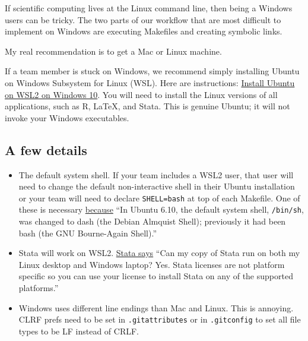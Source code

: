 If scientific computing lives at the Linux command line,
then being a Windows users can be tricky.
The two parts of our workflow that are most difficult to implement on Windows
are executing Makefiles and creating symbolic links.

My real recommendation is to get a Mac or Linux machine.

If a team member is stuck on Windows,
we recommend simply installing Ubuntu on Windows Subsystem for Linux (WSL).
Here are instructions:
\href{https://ubuntu.com/tutorials/install-ubuntu-on-wsl2-on-windows-10}{Install Ubuntu on WSL2 on Windows 10}.
You will need to install the Linux versions of all applications, such as R, LaTeX, and Stata.
This is genuine Ubuntu; it will not invoke your Windows executables.

\subsection{A few details}

\begin{itemize}
\item
The default system shell.
If your team includes a WSL2 user,
that user will need to
change the default non-interactive shell in their Ubuntu installation
or
your team will need to declare \texttt{SHELL=bash} at top of each Makefile.
One of these is necessary \href{https://wiki.ubuntu.com/DashAsBinSh}{because}
``In Ubuntu 6.10, the default system shell, \texttt{/bin/sh}, was changed to dash (the Debian Almquist Shell); previously it had been bash (the GNU Bourne-Again Shell).''
\item
Stata will work on WSL2.
\href{https://www.stata.com/products/linux/}{Stata says} ``Can my copy of Stata run on both my Linux desktop and Windows laptop?
Yes. Stata licenses are not platform specific so you can use your license to install Stata on any of the supported platforms.''
\item
Windows uses different line endings than Mac and Linux.
This is annoying.
CLRF prefs need to be set in \texttt{.gitattributes} or in \texttt{.gitconfig} to set all file types to be LF instead of CRLF.
\end{itemize}

